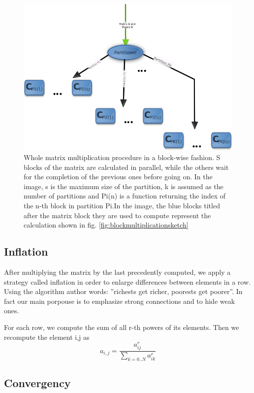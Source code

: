 \begin{figure}
\centering
\includegraphics[scale=0.7]{matrixmultiplication.png}
\caption{Whole matrix multiplication procedure in a block-wise fashion. S blocks of the matrix are calculated
in parallel, while the others wait for the completion of the previous ones before going on.
In the image, s is the maximum size of the partition, k is assumed as the number of partitions and Pi(n) is a function
returning the index of the n-th block in partition Pi.In the image, the blue blocks titled after the matrix block they are used to compute represent the calculation shown in fig. \ref{fig:blockmultiplicationsketch}}
\label{fig:matrixmultiplicationsketch}
\end{figure}

\subsection{Inflation}

After multiplying the matrix by the last precedently computed, we apply a strategy
called inflation in order to enlarge differences between elements in a row.
Using the algorithm author words: ''richests get richer, poorests get poorer''.
In fact our main porpouse is to emphasize strong connections and to hide
weak ones.

For each row, we compute the sum of all r-th powers of its elements.
Then we recompute the element i,j as
$$ a_{i,j} = \frac{a_{ij}^r} {\sum_{k=0..N} a_{ik}^r}$$


\subsection{Convergency}



